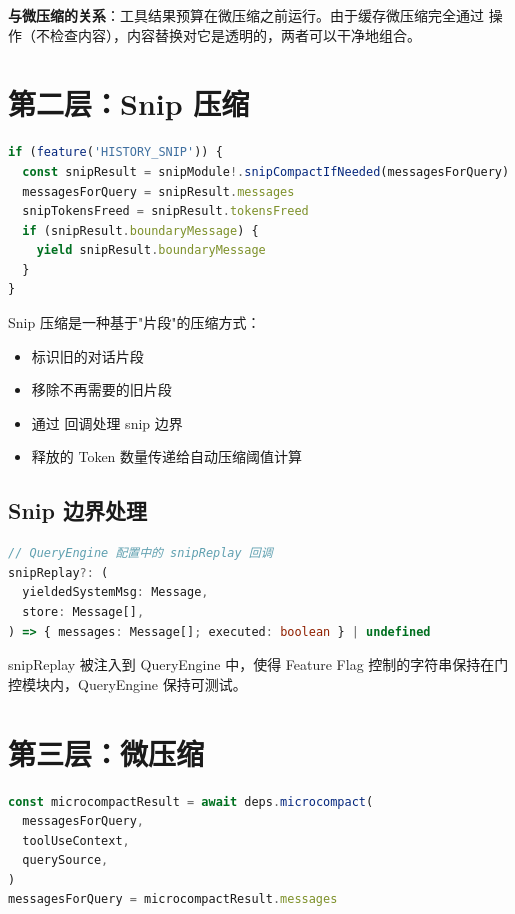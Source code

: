 \textbf{与微压缩的关系}：工具结果预算在微压缩之前运行。由于缓存微压缩完全通过  操作（不检查内容），内容替换对它是透明的，两者可以干净地组合。

\section{第二层：Snip 压缩}

\begin{lstlisting}[language=TypeScript,breaklines=true]
if (feature('HISTORY_SNIP')) {
  const snipResult = snipModule!.snipCompactIfNeeded(messagesForQuery)
  messagesForQuery = snipResult.messages
  snipTokensFreed = snipResult.tokensFreed
  if (snipResult.boundaryMessage) {
    yield snipResult.boundaryMessage
  }
}
\end{lstlisting}

Snip 压缩是一种基于"片段"的压缩方式：
\begin{itemize}[nosep]
  \item 标识旧的对话片段
  \item 移除不再需要的旧片段
  \item 通过  回调处理 snip 边界
  \item 释放的 Token 数量传递给自动压缩阈值计算
\end{itemize}

\subsection{Snip 边界处理}

\begin{lstlisting}[language=TypeScript,breaklines=true]
// QueryEngine 配置中的 snipReplay 回调
snipReplay?: (
  yieldedSystemMsg: Message,
  store: Message[],
) => { messages: Message[]; executed: boolean } | undefined
\end{lstlisting}

snipReplay 被注入到 QueryEngine 中，使得 Feature Flag 控制的字符串保持在门控模块内，QueryEngine 保持可测试。

\section{第三层：微压缩}

\begin{lstlisting}[language=TypeScript,breaklines=true]
const microcompactResult = await deps.microcompact(
  messagesForQuery,
  toolUseContext,
  querySource,
)
messagesForQuery = microcompactResult.messages
\end{lstlisting}

